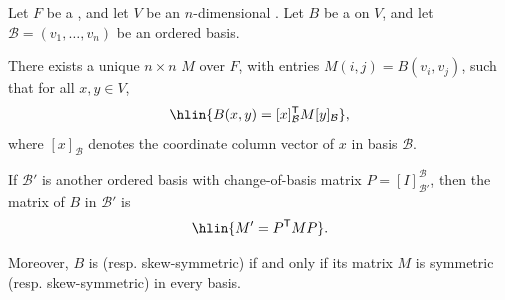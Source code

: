 \begin{proposition} \label{proposition:matrix_representation_of_bilinear_forms_and_change_of_basis_transformation}
    Let $F$ be a , and let $V$ be an $n$-dimensional . Let $B$ be a  on $V$, and let $\mathcal{B} = (v_1, \dots, v_n)$ be an ordered basis.

    There exists a unique $n \times n$  $M$ over $F$, with entries $M(i,j) = B(v_i, v_j)$, such that for all $x, y \in V$,
    $$\hlin{B(x, y) = [x]_{\mathcal{B}}^{\mathsf{T}} M [y]_{\mathcal{B}}},$$
    where $[x]_{\mathcal{B}}$ denotes the coordinate column vector of $x$ in basis $\mathcal{B}$.

    If $\mathcal{B}'$ is another ordered basis with change-of-basis matrix $P = [I]_{\mathcal{B}'}^{\mathcal{B}}$, then the matrix of $B$ in $\mathcal{B}'$ is
    $$\hlin{M' = P^{\mathsf{T}} M P}.$$

    Moreover, $B$ is  (resp. skew-symmetric) if and only if its matrix $M$ is symmetric (resp. skew-symmetric) in every basis.
\end{proposition}
